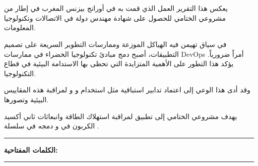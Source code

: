 \chapter*{}

\begin{RLtext}
يعكس هذا التقرير العمل الذي قمت به في أورانج بيزنس المغرب في إطار من مشروعي الختامي للحصول على شهادة مهندس دولة في الاتصالات وتكنولوجيا المعلومات.

 في سياق تهيمن فيه الهياكل الموزعة وممارسات التطوير السريعة على تصميم التطبيقات، أصبح دمج مبادئ تكنولوجيا الخضراء في ممارسات DevOps أمراً ضرورياً. يؤكد هذا التطور على الأهمية المتزايدة التي تحظى بها الاستدامة البيئية في قطاع التكنولوجيا.
  
 وقد أدى هذا الوعي إلى اعتماد تدابير استباقية مثل استخدام  و  و  لمراقبة هذه المقاييس البيئية وتصورها.
 
 يهدف مشروعي الختامي إلى تطبيق  لمراقبة استهلاك الطاقة وانبعاثات ثاني أكسيد الكربون في  و دمجه في سلسلة .
\end{RLtext}

\noindent\rule[2pt]{\textwidth}{0.5pt}

\begin{RLtext} 

{\textbf{الكلمات المفتاحية:}} 
\\

\end{RLtext}

\noindent\rule[2pt]{\textwidth}{0.5pt}
